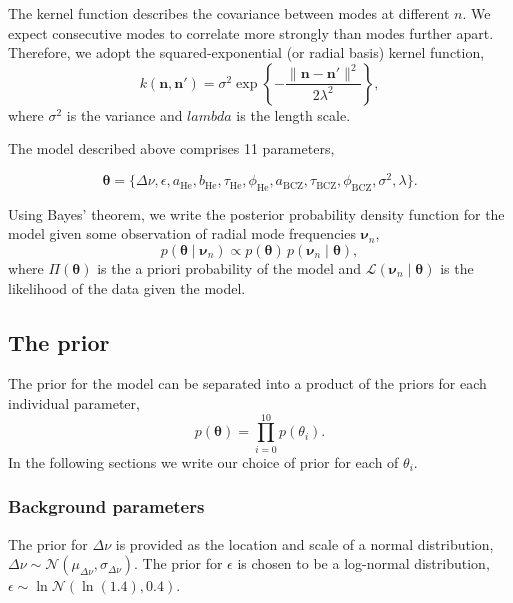 \documentclass[linenumbers,modern]{aastex631}
\newcommand{\helium}{\mathrm{He}}
\newcommand{\bcz}{\mathrm{BCZ}}
\begin{document}
The kernel function describes the covariance between modes at different \(n\).
We expect consecutive modes to correlate more strongly than modes further
apart. Therefore, we adopt the squared-exponential (or radial basis) kernel
function,
%
\begin{equation}
    k(\bm n, \bm n') = \sigma^2 
    \exp\left\{- \frac{\| \bm n - \bm n' \|^2}{2\lambda^2}\right\},
\end{equation}
%
where \(\sigma^2\) is the variance and \(lambda\) is the length scale.

The model described above comprises 11 parameters,

\begin{equation}
    \bm\theta = \{\Delta\nu, \epsilon, a_\helium, b_\helium, \tau_\helium,
    \phi_\helium, a_\bcz, \tau_\bcz, \phi_\bcz, \sigma^2, \lambda\}.
\end{equation}

Using Bayes' theorem, we write the posterior probability density function for
the model given some observation of radial mode frequencies \(\bm\nu_n\),
%
\begin{equation}
    p(\bm\theta \mid \bm\nu_n) \propto p(\bm\theta) \, 
    p(\bm\nu_n \mid \bm\theta),
\end{equation}
%
where \(\Pi(\bm\theta)\) is the a priori probability of the model and
\(\mathcal{L}(\bm\nu_n \mid \bm\theta)\) is the likelihood of the data given the
model.


\subsection{The prior} \label{sec:prior}

The prior for the model can be separated into a product of the priors for each
individual parameter,
%
\begin{equation}
    p(\bm\theta) = \prod_{i=0}^{10} p(\theta_i).
\end{equation}
%
In the following sections we write our choice of prior for each of
\(\theta_i\).

\subsubsection{Background parameters} \label{sec:bkg-params}

The prior for \(\Delta\nu\) is provided as the location and scale of a
normal distribution, \(\Delta\nu \sim \mathcal{N}(\mu_{\Delta\nu},
\sigma_{\Delta\nu})\). The prior for \(\epsilon\) is chosen to be a log-normal
distribution, \(\epsilon \sim \ln\mathcal{N}(\ln(1.4), 0.4)\).
\end{document}
